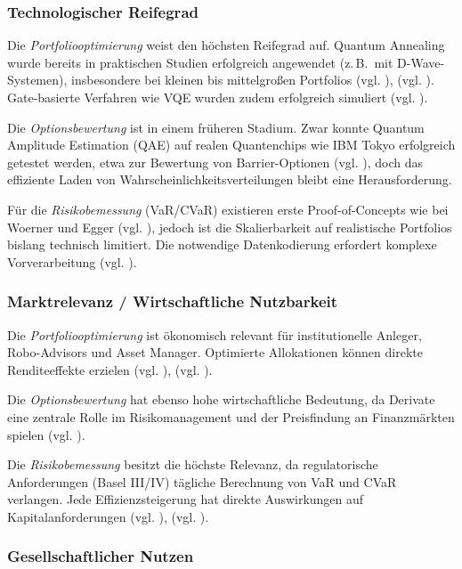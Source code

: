 \subsubsection*{Technologischer Reifegrad}

Die \textit{Portfoliooptimierung} weist den höchsten Reifegrad auf. Quantum Annealing wurde bereits in praktischen Studien erfolgreich angewendet (z.\,B.\ mit D-Wave-Systemen), insbesondere bei kleinen bis mittelgroßen Portfolios (vgl. \cite{rosenberg_finding_2016}), (vgl. \cite{mugel_dynamic_2022}). Gate-basierte Verfahren wie VQE wurden zudem erfolgreich simuliert (vgl. \cite{egger_quantum_2020}).

Die \textit{Optionsbewertung} ist in einem früheren Stadium. Zwar konnte Quantum Amplitude Estimation (QAE) auf realen Quantenchips wie IBM Tokyo erfolgreich getestet werden, etwa zur Bewertung von Barrier-Optionen (vgl. \cite{stamatopoulos_option_2020}), doch das effiziente Laden von Wahrscheinlichkeitsverteilungen bleibt eine Herausforderung.

Für die \textit{Risikobemessung} (VaR/CVaR) existieren erste Proof-of-Concepts wie bei Woerner und Egger (vgl. \cite{orus_quantum_2019}), jedoch ist die Skalierbarkeit auf realistische Portfolios bislang technisch limitiert. Die notwendige Datenkodierung erfordert komplexe Vorverarbeitung (vgl. \cite{zoufal_quantum_2019}).

\subsubsection*{Marktrelevanz / Wirtschaftliche Nutzbarkeit}

Die \textit{Portfoliooptimierung} ist ökonomisch relevant für institutionelle Anleger, Robo-Advisors und Asset Manager. Optimierte Allokationen können direkte Renditeeffekte erzielen (vgl. \cite{sakuler_real-world_2025}), (vgl. \cite{mugel_dynamic_2022}).

Die \textit{Optionsbewertung} hat ebenso hohe wirtschaftliche Bedeutung, da Derivate eine zentrale Rolle im Risikomanagement und der Preisfindung an Finanzmärkten spielen (vgl. \cite{stamatopoulos_option_2020}).

Die \textit{Risikobemessung} besitzt die höchste Relevanz, da regulatorische Anforderungen (Basel III/IV) tägliche Berechnung von VaR und CVaR verlangen. Jede Effizienzsteigerung hat direkte Auswirkungen auf Kapitalanforderungen (vgl. \cite{orus_quantum_2019}), (vgl. \cite{bouland_prospects_2020}).

\subsubsection*{Gesellschaftlicher Nutzen}

